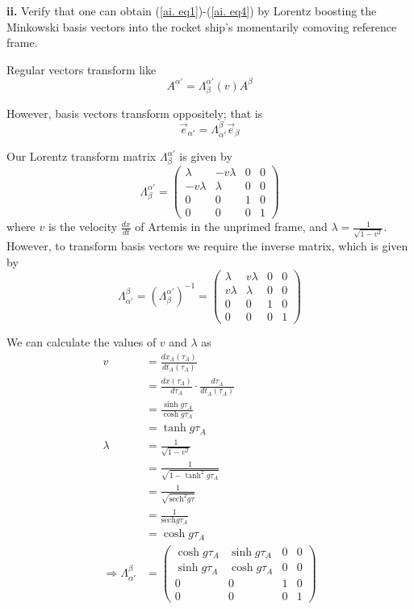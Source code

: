 \documentclass[a4paper]{article} %
\newcommand{\sech}{\text{sech}}
\newcommand{\pmx}[1]{\begin{pmatrix}#1\end{pmatrix}}
\begin{document}
\begin{framed}
\textbf{ii.} 
Verify that one can obtain (\ref{ai. eq1})-(\ref{ai. eq4}) by Lorentz boosting the Minkowski basis vectors into the rocket ship’s momentarily comoving reference frame.
\end{framed}

Regular vectors transform like
\begin{equation}
A^{\alpha'}=\Lambda^{\alpha'}_{\beta}(v)A^{\beta}
\end{equation}

However, basis vectors transform oppositely; that is
\begin{equation}
\vec{e}_{\alpha'}=\Lambda^{\beta}_{\alpha'}\vec{e}_{\beta}
\end{equation}

Our Lorentz transform matrix $\Lambda^{\alpha'}_{\beta}$ is given by
\begin{equation}
\Lambda^{\alpha'}_{\beta}=\pmx{\lambda&-v\lambda&0&0\\
-v\lambda&\lambda&0&0\\
0&0&1&0\\
0&0&0&1}
\end{equation}
where $v$ is the velocity $\frac{dx}{dt}$ of Artemis in the unprimed frame, and $\lambda=\frac{1}{\sqrt{1-v^2}}$. However, to transform basis vectors we require the inverse matrix, which is given by
\begin{equation}
\Lambda^{\beta}_{\alpha'}=\left(\Lambda^{\alpha'}_{\beta}\right)^{-1}=\pmx{\lambda&v\lambda&0&0\\
v\lambda&\lambda&0&0\\
0&0&1&0\\
0&0&0&1}
\end{equation}

We can calculate the values of $v$ and $\lambda$ as
\begin{align}
v&=\frac{dx_A(\tau_A)}{dt_A(\tau_A)}\\
&=\frac{dx(\tau_A)}{d\tau_A}\cdot\frac{d\tau_A}{dt_A(\tau_A)}\\
&=\frac{\sinh g\tau_A}{\cosh g\tau_A}\\
&=\tanh g\tau_A\\
\lambda&=\frac{1}{\sqrt{1-v^2}}\\
&=\frac{1}{\sqrt{1-\tanh^2 g\tau_A}}\\
&=\frac{1}{\sqrt{\sech^2 g\tau}}\\
&=\frac{1}{\sech g\tau_A}\\
&=\cosh g\tau_A\\
\Rightarrow \Lambda^{\beta}_{\alpha'}&=\pmx{\cosh g\tau_A&\sinh g\tau_A&0&0\\
\sinh g\tau_A &\cosh g\tau_A&0&0\\
0&0&1&0\\
0&0&0&1}
\end{align}
\end{document}
